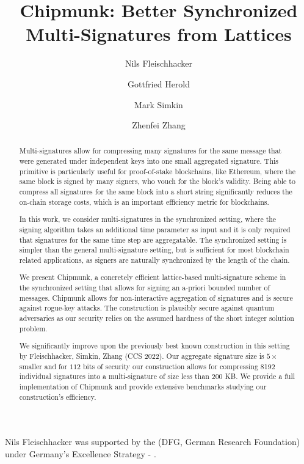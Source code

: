 \documentclass[sigconf]{acmart}
\title{Chipmunk: Better Synchronized Multi-Signatures from Lattices}
\author{Nils Fleischhacker}
\affiliation{
  \institution{Ruhr University Bochum}
  \city{Bochum}
  \country{Germany}
}
\author{Gottfried Herold}
\affiliation{
  \institution{Ethereum Foundation}
  \city{Bonn}
  \country{Germany}
}
\author{Mark Simkin}
\affiliation{
  \institution{Ethereum Foundation}
  \city{Aarhus}
  \country{Denmark}
}
\author{Zhenfei Zhang}
\affiliation{
  \institution{Ethereum Foundation}
  \city{Boston}
  \country{USA}
}
\theoremstyle{acmdefinition}
\theoremstyle{acmplain}
\begin{document}
\begin{abstract}
Multi-signatures allow for compressing many signatures for the same message that were generated under independent keys into one small aggregated signature. 
This primitive is particularly useful for proof-of-stake blockchains, like Ethereum, where the same block is signed by many signers, who vouch for the block's validity.
Being able to compress all signatures for the same block into a short string significantly reduces the on-chain storage costs, which is an important efficiency metric for blockchains.

In this work, we consider multi-signatures in the synchronized setting, where the signing algorithm takes an additional time parameter as input and it is only required that signatures for the same time step are aggregatable.
The synchronized setting is simpler than the general multi-signature setting, but is sufficient for most blockchain related applications, as signers are naturally synchronized by the length of the chain.

We present Chipmunk, a concretely efficient lattice-based multi-signature scheme in the synchronized setting that allows for signing an a-priori bounded number of messages.
Chipmunk allows for non-interactive aggregation of signatures and is secure against rogue-key attacks.
The construction is plausibly secure against quantum adversaries as our security relies on the assumed hardness of the short integer solution problem.

We significantly improve upon the previously best known construction in this setting by Fleischhacker, Simkin, Zhang (CCS 2022).
Our aggregate signature size is $5 \times$ smaller and for $112$ bits of security our construction allows for compressing 8192 individual signatures into a multi-signature of size less than $200$ KB.
We provide a full implementation of Chipmunk and provide extensive benchmarks studying our construction's efficiency.

\end{abstract}
\maketitle









\begin{acks}
   Nils Fleischhacker was supported by the  (DFG, German Research Foundation) under Germany's Excellence Strategy - .
\end{acks}




\end{document}
